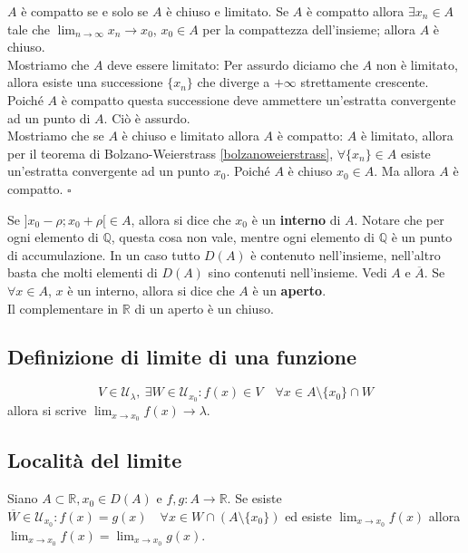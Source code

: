 \documentclass{article}
\begin{document}
\begin{dimostrazione}$A$ è compatto se e solo se $A$ è chiuso e limitato.
Se $A$ è compatto allora $\exists {x_n} \in A$ tale che $\lim_{n \to \infty}x_n \rightarrow x_0$, $x_0 \in A$ per la compattezza dell'insieme; allora $A$ è chiuso.\\
Mostriamo che $A$ deve essere limitato: Per assurdo diciamo che $A$ non è limitato, allora esiste una successione $\{x_n\}$ che diverge a $+ \infty$ strettamente crescente. Poiché $A$ è compatto questa successione deve ammettere un'estratta convergente ad un punto di $A$. Ciò è assurdo.\\

Mostriamo che se $A$ è chiuso e limitato allora $A$ è compatto: $A$ è limitato, allora per il teorema di Bolzano-Weierstrass \ref{bolzanoweierstrass}, $\forall \{x_n\} \in A$ esiste un'estratta convergente ad un punto $x_0$. Poiché $A$ è chiuso $x_0 \in A$. Ma allora $A$ è compatto. $\square$

\end{dimostrazione}

Se $]x_0- \rho ; x_0 + \rho[ \in A$, allora si dice che $x_0$ è un \textbf{interno} di $A$. Notare che per ogni elemento di $\mathbb{Q}$, questa cosa non vale, mentre ogni elemento di $\mathbb{Q}$ è un punto di accumulazione. In un caso tutto $D(A)$ è contenuto nell'insieme, nell'altro basta che molti elementi di $D(A)$ sino contenuti nell'insieme. Vedi $A$ e $\overline A$.
Se $\forall x \in A$, $x$ è un interno, allora si dice che $A$ è un \textbf{aperto}.\\

Il complementare in $\mathbb{R}$ di un aperto è un chiuso.

\subsection{Definizione di limite di una funzione}
\begin{equation*}
	V \in \mathcal{U}_\lambda, \ \exists W \in \mathcal{U}_{x_0}:f(x)\in V \quad \forall x \in A \setminus \{x_0\}\cap W
\end{equation*}
allora si scrive $\lim_{x \to x_0}f(x)\rightarrow \lambda$.

\subsection{Località del limite}

Siano $A \subset \mathbb{R}, x_0 \in D(A)$ e $f,g:A\rightarrow \mathbb{R}$. Se esiste $\overline W \in \mathcal{U}_{x_0}:f(x)=g(x) \quad \forall x \in W \cap (A \setminus \{x_0\})$ ed esiste $\lim_{x \to x_0}f(x)$ allora $ \lim_{x \to x_0}f(x)=\lim_{x \to x_0}g(x)$.
\end{document}
